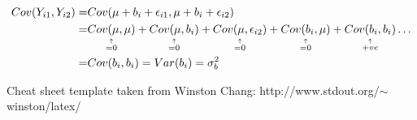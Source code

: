 \documentclass[10pt,landscape]{article}
\newcommand{\explain}[2]{\underset{\mathclap{\overset{\uparrow}{#2}}}{#1}}
\begin{document}
\begin{multicols}{3}
\begin{equation}
\begin{split}
Cov(Y_{i1}, Y_{i2}) =& Cov(\mu + b_i + \epsilon_{i1} , \mu + b_i + \epsilon_{i2})\\
=& \explain{Cov(\mu, \mu)}{=0} + 
 \explain{Cov(\mu, b_i)}{=0} +
 \explain{Cov(\mu, \epsilon_{i2})}{=0} +
 \explain{Cov(b_i,\mu)}{=0} +
  \explain{Cov(b_i,b_i)}{+ve} \dots\\
  =&  Cov(b_i, b_i) = Var(b_i) = \sigma^2_b\\
\end{split}
\end{equation}





Cheat sheet template taken from Winston Chang: http://www.stdout.org/$\sim$winston/latex/



\end{multicols}
\end{document}
